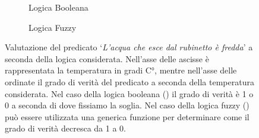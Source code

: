 \documentclass[a4paper,12pt]{report}
\begin{document}
\begin{figure}
    \begin{subfigure}[t]{.46\textwidth}
        \centering
        \caption{Logica Booleana}
        \label{subfig:Logica_booleana}
    \end{subfigure}
    \quad
    \begin{subfigure}[t]{.5\textwidth}
        \centering
        \caption{Logica Fuzzy}
        \label{subfig:Logica_fuzzy_grafico}
    \end{subfigure}
    \caption{Valutazione del predicato `\textit{L'acqua che esce dal rubinetto è fredda}' a seconda della logica considerata. Nell'asse delle ascisse è rappresentata la temperatura in gradi C°, mentre nell'asse delle ordinate il grado di verità del predicato a seconda della temperatura considerata. Nel caso della logica booleana () il grado di verità è 1 o 0 a seconda di dove fissiamo la soglia. Nel caso della logica fuzzy () può essere utilizzata una generica funzione per determinare come il grado di verità decresca da 1 a 0.}
    \label{fig:Differenze_Logiche}
\end{figure}
\end{document}
